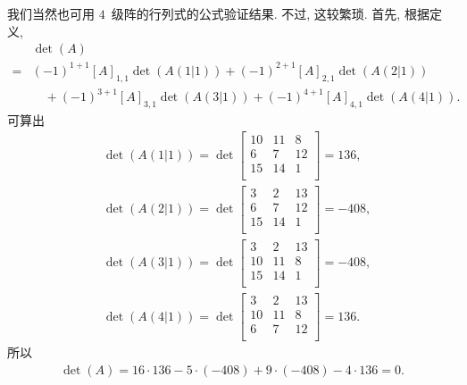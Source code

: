 \documentclass[%
    UTF8,%
    fontset=none,%
    punct=kaiming,%
    zihao=-4,%
    a4paper,%
    oneside,%
]{ctexbook}
\begin{document}
\begin{example}
    我们当然也可用
    \(4\)~级阵的行列式的公式验证结果.
    不过, 这较繁琐.
    首先, 根据定义,
    \begin{align*}
             & \det {(A)}                           \\
        = {} & (-1)^{1+1} [A]_{1,1} \det {(A(1|1))}
        + (-1)^{2+1} [A]_{2,1} \det {(A(2|1))}
        \\
             & \quad
        + (-1)^{3+1} [A]_{3,1} \det {(A(3|1))}
        + (-1)^{4+1} [A]_{4,1} \det {(A(4|1))}.
    \end{align*}
    可算出
    \begin{align*}
         & \det {(A(1|1))}
        = \det {\begin{bmatrix}
                        10 & 11 & 8  \\
                        6  & 7  & 12 \\
                        15 & 14 & 1  \\
                    \end{bmatrix}}
        = 136,             \\
         & \det {(A(2|1))}
        = \det {\begin{bmatrix}
                        3  & 2  & 13 \\
                        6  & 7  & 12 \\
                        15 & 14 & 1  \\
                    \end{bmatrix}}
        = -408,            \\
         & \det {(A(3|1))}
        = \det {\begin{bmatrix}
                        3  & 2  & 13 \\
                        10 & 11 & 8  \\
                        15 & 14 & 1  \\
                    \end{bmatrix}}
        = -408,            \\
         & \det {(A(4|1))}
        = \det {\begin{bmatrix}
                        3  & 2  & 13 \\
                        10 & 11 & 8  \\
                        6  & 7  & 12 \\
                    \end{bmatrix}}
        = 136.
    \end{align*}
    所以
    \begin{align*}
        \det {(A)}
        = 16 \cdot 136 - 5 \cdot (-408)
        + 9 \cdot (-408) - 4 \cdot 136
        = 0.
    \end{align*}
\end{example}
\end{document}
